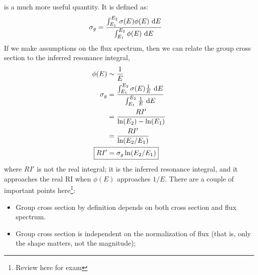 \documentclass{school-22.211-notes}
\begin{document}
 is a much more useful quantity. It is defined as:
\begin{align}
\sigma_g &= \frac{\int_{E_1}^{E_2} \sigma(E) \phi(E) \mbox{ }\mathrm{d} E }{\int_{E_1}^{E_2} \phi(E) \mbox{ }\mathrm{d} E} 
\end{align}
If we make assumptions on the flux spectrum, then we can relate the group cross section to the inferred resonance integral,
\begin{align}
\phi(E) &\sim \frac{1}{E} \\
\sigma_g &= \frac{\int_{E_1}^{E_2} \sigma(E) \frac{1}{E} \dE }{\int_{E_1}^{E_2} \frac{1}{E} \dE} \\
&= \frac{RI'}{\ln(E_2) - \ln(E_1)}  \\
&= \frac{RI'}{\ln(E_2/E_1)} \\
\Aboxed{ RI' &= \sigma_g \ln(E_2/E_1) }
\end{align}
where $RI'$ is not the real integral; it is the inferred resonance integral, and it approaches the real RI when $\phi(E)$ approaches $1/E$. There are a couple of important points here\footnote{Review here for exam}:
\begin{itemize}
\item Group cross section by definition depends on both cross section and flux spectrum. 
\item Group cross section is independent on the normalization of flux (that is, only the shape matters, not the magnitude);
\end{itemize}
\end{document}
